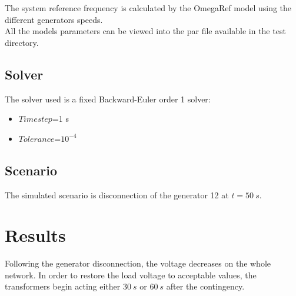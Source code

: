 \documentclass[a4paper, 12pt]{report}
\begin{document}
The system reference frequency is calculated by the OmegaRef model using the different generators speeds.\\

All the models parameters can be viewed into the par file available in the test directory.

\subsection{Solver}
The solver used is a fixed Backward-Euler order 1 solver:
\begin{itemize}
\item $Time step$=1 s
\item $Tolerance$=$10^{-4}$
\end{itemize}

\subsection{Scenario}

The simulated scenario is disconnection of the generator 12 at $t = 50 \ s$.

\newpage
\section{Results}

Following the generator disconnection, the voltage decreases on the whole network. In order to restore the load voltage to acceptable values, the transformers begin acting either $30 \ s$ or $60 \ s$ after the contingency.
\end{document}
